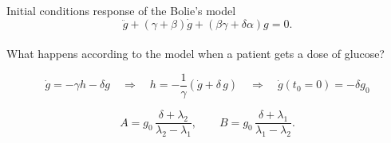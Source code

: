 \documentclass{beamer}
\begin{document}
\begin{frame}{Initial conditions response of the Bolie's model}
\begin{equation*}
	\ddot g+(\gamma+\beta)\dot g+(\beta \gamma+\delta \alpha)g=0.
\end{equation*}\\
\vspace{1cm}
What happens according to the model when a patient gets a dose of glucose?\\


\begin{equation*}
\dot g=-\gamma h - \delta g \quad \Rightarrow \quad h = -\frac{1}{\gamma}\left( \dot{g} + \delta\,g \right) \quad \Rightarrow  \quad \dot g(t_0=0)=-\delta g_0
\end{equation*}

\begin{equation*}	
	A = g_0\,\frac{\delta+\lambda_2}{\lambda_2-\lambda_1}, \qquad B = g_0\,\frac{\delta+\lambda_1}{\lambda_1-\lambda_2}.
\end{equation*}


\end{frame}

\begin{frame}{ }

\end{frame}
\end{document}
